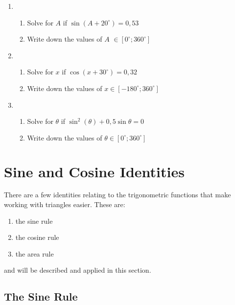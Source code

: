 {\begin{enumerate}
\begin{enumerate}
	\item Hence determine values of $\theta \in [0^\circ;720^\circ]$.
	\end{enumerate}
\item
	\begin{enumerate}
	\item Solve for $A$ if $\sin (A+20^\circ) = 0,53$
	\item Write down the values of $A$ $\in [0^\circ;360^\circ]$
	\end{enumerate}
\item
	\begin{enumerate}
	\item Solve for $x$ if $\cos (x+30^\circ) = 0,32$
	\item Write down the values of $x \in [-180^\circ;360^\circ]$
	\end{enumerate}
\item
	\begin{enumerate}
	\item Solve for $\theta$ if $\sin^2 (\theta) + 0,5\sin\theta = 0$
	\item Write down the values of $\theta \in [0^\circ;360^\circ]$
	\end{enumerate}
\end{enumerate}


\practiceinfo}

\section{Sine and Cosine Identities}
There are a few identities relating to the trigonometric functions that make working with triangles easier. These are:
\begin{enumerate}
\item{the sine rule}
\item{the cosine rule}
\item{the area rule}
\end{enumerate}
and will be described and applied in this section.

\subsection{The Sine Rule}


